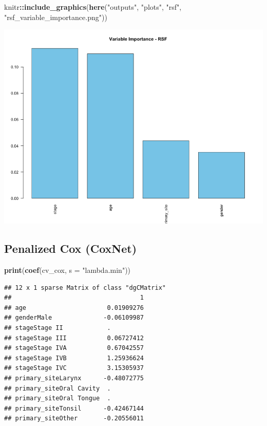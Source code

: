 \documentclass[
  11pt,
]{article}
\newenvironment{Shaded}{\begin{snugshade}}{\end{snugshade}}
\newcommand{\AttributeTok}[1]{\textcolor[rgb]{0.13,0.29,0.53}{#1}}
\newcommand{\FunctionTok}[1]{\textcolor[rgb]{0.13,0.29,0.53}{\textbf{#1}}}
\newcommand{\NormalTok}[1]{#1}
\newcommand{\SpecialCharTok}[1]{\textcolor[rgb]{0.81,0.36,0.00}{\textbf{#1}}}
\newcommand{\StringTok}[1]{\textcolor[rgb]{0.31,0.60,0.02}{#1}}
\begin{document}
\begin{Shaded}
\begin{Highlighting}[]
\NormalTok{knitr}\SpecialCharTok{::}\FunctionTok{include\_graphics}\NormalTok{(}\FunctionTok{here}\NormalTok{(}\StringTok{"outputs"}\NormalTok{, }\StringTok{"plots"}\NormalTok{, }\StringTok{"rsf"}\NormalTok{, }\StringTok{"rsf\_variable\_importance.png"}\NormalTok{))}
\end{Highlighting}
\end{Shaded}

\includegraphics[width=0.8\linewidth]{../outputs/plots/rsf/rsf_variable_importance}

\subsection{Penalized Cox (CoxNet)}\label{penalized-cox-coxnet}

\begin{Shaded}
\begin{Highlighting}[]
\FunctionTok{print}\NormalTok{(}\FunctionTok{coef}\NormalTok{(cv\_cox, }\AttributeTok{s =} \StringTok{"lambda.min"}\NormalTok{))}
\end{Highlighting}
\end{Shaded}

\begin{verbatim}
## 12 x 1 sparse Matrix of class "dgCMatrix"
##                                   1
## age                      0.01909276
## genderMale              -0.06109987
## stageStage II            .         
## stageStage III           0.06727412
## stageStage IVA           0.67042557
## stageStage IVB           1.25936624
## stageStage IVC           3.15305937
## primary_siteLarynx      -0.48072775
## primary_siteOral Cavity  .         
## primary_siteOral Tongue  .         
## primary_siteTonsil      -0.42467144
## primary_siteOther       -0.20556011
\end{verbatim}
\end{document}
